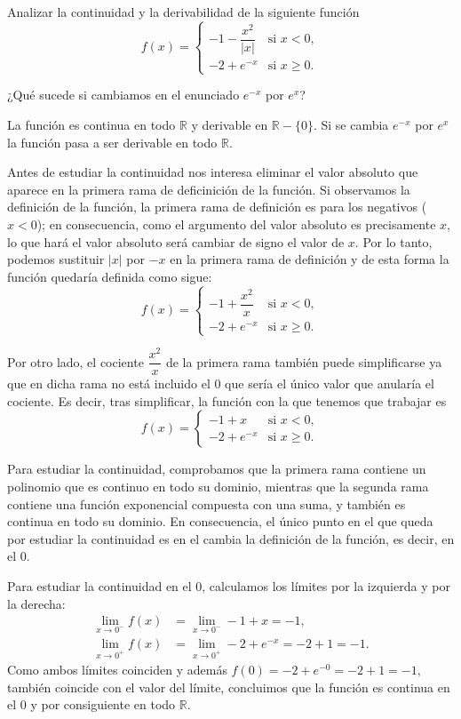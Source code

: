 {Analizar la continuidad y la derivabilidad de la siguiente función
\[
f(x)=
\begin{cases}
-1-\dfrac{x^{2}}{\left| x\right| } & \mbox{si $x<0$}, \\
-2+e^{-x} & \mbox{si $x\geq 0$}.
\end{cases}
\]

¿Qué sucede si cambiamos en el enunciado $e^{-x}$ por $e^{x}$?
}
{La función es continua en todo $\mathbb{R}$ y derivable en $\mathbb{R}-\{0\}$.
Si se cambia $e^{-x}$ por $e^{x}$ la función pasa a ser derivable en todo $\mathbb{R}$.
}
{Antes de estudiar la continuidad nos interesa eliminar el valor absoluto que aparece en la primera rama de deficinición de la función. Si observamos la definición de la función, la primera rama de definición es para los negativos ($x<0$); en consecuencia, como el argumento del valor absoluto es precisamente $x$, lo que hará el valor absoluto será cambiar de signo el valor de $x$. Por lo tanto, podemos sustituir $\left|x\right|$ por $-x$ en la primera rama de definición y de esta forma la función quedaría definida como sigue:
\[
f(x)=
\begin{cases}
-1+\dfrac{x^{2}}{x} & \mbox{si $x<0$}, \\
-2+e^{-x} & \mbox{si $x\geq 0$}.
\end{cases}
\]

Por otro lado, el cociente $\dfrac{x^{2}}{x}$ de la primera rama también puede simplificarse ya que en dicha rama no está incluido el 0 que sería el único valor que anularía el cociente. Es decir, tras simplificar, la función con la que tenemos que trabajar es
\[
f(x)=
\begin{cases}
-1+x & \mbox{si $x<0$}, \\
-2+e^{-x} & \mbox{si $x\geq 0$}.
\end{cases}
\]

Para estudiar la continuidad, comprobamos que la primera rama contiene un polinomio que es continuo en todo su dominio, mientras que la segunda rama contiene una función exponencial compuesta con una suma, y también es continua en todo su dominio. En consecuencia, el único punto en el que queda por estudiar la continuidad es en el cambia la definición de la función, es decir, en el 0.

Para estudiar la continuidad en el 0, calculamos los límites por la izquierda y por la derecha:
\begin{align*}
\lim_{x\rightarrow 0^{-}}f(x) &= \lim_{x\rightarrow 0^{-}}-1+x=-1, \\
\lim_{x\rightarrow 0^{+}}f(x) &= \lim_{x\rightarrow 0^{+}}-2+e^{-x}=-2+1=-1.
\end{align*}
Como ambos límites coinciden y además $f(0)=-2+e^{-0}=-2+1=-1,$ también coincide con el valor del límite, concluimos que la función es continua en el 0 y por consiguiente en todo $\mathbb{R}$.

}
